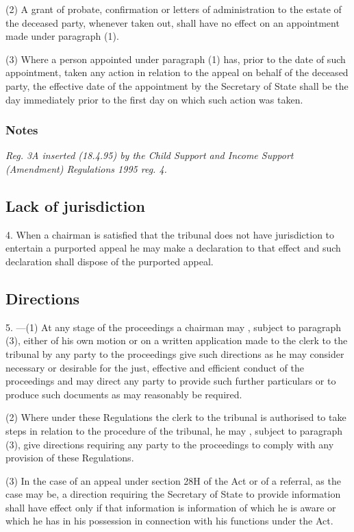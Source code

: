 \documentclass[a4paper]{article}
\newcommand\amendment[1]{\subsubsection*{Notes}{\itshape\frenchspacing\footnotesize #1 \par}}
\begin{document}
(2) A grant of probate, confirmation or letters of administration to the estate of the deceased party, whenever taken out, shall have no effect on an appointment made under paragraph (1).

(3) Where a person appointed under paragraph (1) has, prior to the date of such appointment, taken any action in relation to the appeal on behalf of the deceased party, the effective date of the appointment by the Secretary of State shall be the day immediately prior to the first day on which such action was taken.

\amendment{
Reg. 3A inserted (18.4.95) by the Child Support and Income Support (Amendment) Regulations 1995 reg. 4.
}

\subsection[4. Lack of jurisdiction]{Lack of jurisdiction}

4.  When a chairman is satisfied that the tribunal does not have jurisdiction to entertain a purported appeal he may make a declaration to that effect and such declaration shall dispose of the purported appeal.

\subsection[5. Directions]{Directions}

5.%
---(1)  %
  At any stage of the proceedings a chairman may%
, subject to paragraph (3),  %
either of his own motion or on a written application made to the clerk to the tribunal by any party to the proceedings give such directions as he may consider necessary or desirable for the just, effective and efficient conduct of the proceedings and may direct any party to provide such further particulars or to produce such documents as may reasonably be required.

(2) Where under these Regulations the clerk to the tribunal is authorised to take steps in relation to the procedure of the tribunal, he may%
, subject to paragraph (3),  %
give directions requiring any party to the proceedings to comply with any provision of these Regulations.

(3) In the case of an appeal under section 28H of the Act or of a referral, as the case may be, a direction requiring the Secretary of State to provide information shall have effect only if that information is information of which he is aware or which he has in his possession in connection with his functions under the Act.
\end{document}
